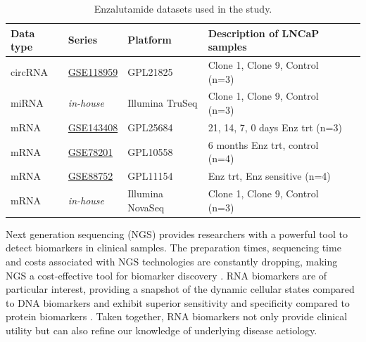\documentclass[twocolumn]{bmcart}%
\begin{document}
\begin{table}[hbt!]
\caption{Enzalutamide datasets used in the study.}
\begin{tabular}{lllll}
\toprule
\textbf{Data type} & \textbf{Series} & \textbf{Platform} & \textbf{Description of LNCaP samples} 
\\
\toprule
circRNA & \href{https://www.ncbi.nlm.nih.gov/geo/query/acc.cgi?acc=GSE118959}{GSE118959} \cite{Greene2019Jul,Lim2021Dec} & GPL21825 & Clone 1, Clone 9, Control (n=3)
\\
miRNA & \textit{in-house} & Illumina TruSeq & Clone 1, Clone 9, Control (n=3)
\\
mRNA & \href{https://www.ncbi.nlm.nih.gov/geo/query/acc.cgi?acc=GSE143408}{GSE143408} \cite{KaylynD.Tousignant2020Jun} & GPL25684 & 21, 14, 7, 0 days Enz trt (n=3)
\\
mRNA & \href{https://www.ncbi.nlm.nih.gov/geo/query/acc.cgi?acc=GSE78201}{GSE78201} \cite{Kregel2016May} & GPL10558 & 6 months Enz trt, control (n=4)
\\
mRNA & \href{https://www.ncbi.nlm.nih.gov/geo/query/acc.cgi?acc=GSE88752}{GSE88752} \cite{Li2018Sep} & GPL11154 & Enz trt, Enz sensitive (n=4)
\\
mRNA & \textit{in-house} & Illumina NovaSeq & Clone 1, Clone 9, Control (n=3)
\\
\toprule
\end{tabular}
\label{tab:enz_datasets}
\end{table}

Next generation sequencing (NGS) provides researchers with a powerful tool to detect biomarkers in clinical samples. The preparation times, sequencing time and costs associated with NGS technologies are constantly dropping, making NGS a cost-effective tool for biomarker discovery \cite{Lopez2015Dec}. RNA biomarkers are of particular interest, providing a snapshot of the dynamic cellular states compared to DNA biomarkers and exhibit superior sensitivity and specificity compared to protein biomarkers \cite{Nimse2016,Xi2017Mar}. Taken together, RNA biomarkers not only provide clinical utility but can also refine our knowledge of underlying disease aetiology. \par
\end{document}

